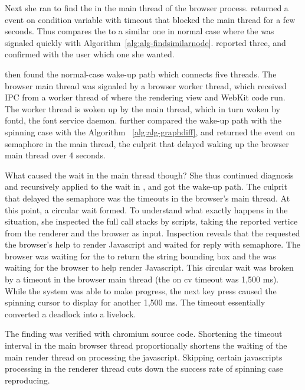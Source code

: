 Next she ran \xxx to find the \spinningnode in the main thread of the browser
process. \xxx returned a  event on condition variable with timeout that
blocked the main thread for a few seconds. Thus \xxx compares the \spinningnode
to a similar one in normal case where the  was signaled quickly with
Algorithm~\ref{alg:alg-findsimilarnode}. \xxx reported three, and confirmed with
the user which one she wanted.

\xxx then found the normal-case wake-up path which connects five threads. The
browser main thread was signaled by a browser worker thread, which received IPC
from a worker thread of  where the rendering view and WebKit code
run. The worker thread is woken up by the  main thread, which in
turn woken by fontd, the font service daemon. \xxx further compared the wake-up
path with the spinning case with the Algorithm ~\ref{alg:alg-graphdiff}, and
returned the  event on semaphore in the  main thread, the
culprit that delayed waking up the browser main thread over 4 seconds.

What caused the wait in the  main thread though? She thus continued
diagnosis and recursively applied \xxx to the wait in , and got
the wake-up path. The culprit that delayed the semaphore was the timeouts in
the browser's main thread. At this point, a circular wait formed. To understand
what exactly happens in the situation, she inspected the full call stacks by
\xxx scripts, taking the reported vertice from the renderer and the browser as
input. Inspection reveals that the  requested the browser's help to
render Javascript and waited for reply with semaphore. The browser was waiting
for the  to return the string bounding box and the 
was waiting for the browser to help render Javascript. This circular wait was
broken by a timeout in the browser main thread (the  on cv timeout was
1,500 ms). While the system was able to make progress, the next key press caused
the spinning cursor to display for another 1,500 ms. The timeout essentially
converted a deadlock into a livelock.

The finding was verified with chromium source code. Shortening the timeout interval
in the main browser thread proportionally shortens the waiting of the main
render thread on processing the javascript. Skipping certain javascripts
processing in the renderer thread cuts down the success rate of spinning case
reproducing.


